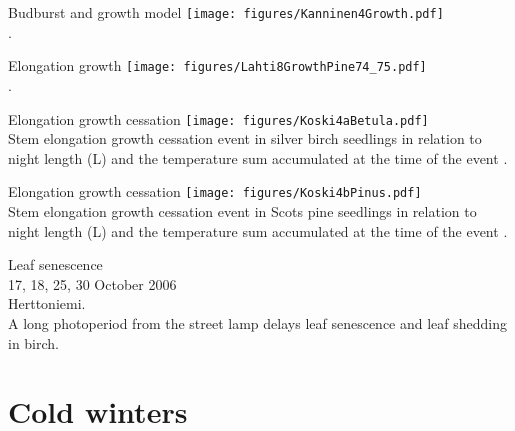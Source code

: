 \documentclass[10pt]{beamer}
\begin{document}
\begin{frame}{Budburst and growth model}
    \centering
    \texttt{[image: figures/Kanninen4Growth.pdf]}\\
    {\small \autocite[from][]{KanninenEtAl1982}.}
\end{frame}

\begin{frame}{Elongation growth}
    \centering
    \texttt{[image: figures/Lahti8GrowthPine74\_75.pdf]}\\
    {\small \autocite[from Kanninen 1990 in][]{LahSmo1990}.}
\end{frame}

\begin{frame}{Elongation growth cessation}
    \centering
    \texttt{[image: figures/Koski4aBetula.pdf]}\\
    {\small Stem elongation growth cessation event in silver birch
    seedlings in relation to night length (L) and the temperature
    sum accumulated at the time of the event \autocite[from][]{Koski1985}.}
\end{frame}

\begin{frame}{Elongation growth cessation}
    \centering
    \texttt{[image: figures/Koski4bPinus.pdf]}\\
    {\small Stem elongation growth cessation event in Scots pine
    seedlings in relation to night length (L) and the temperature
    sum accumulated at the time of the event \autocite[from][]{Koski1985}.}
\end{frame}

\begin{frame}{Leaf senescence}
    \\
    {\small 17, 18, 25, 30 October 2006\\Herttoniemi.\\
    A long photoperiod from the street lamp delays leaf senescence and
    leaf shedding in birch.}
\end{frame}

\section{Cold winters}
\end{document}
